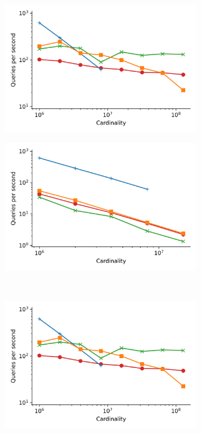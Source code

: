 \begin{figure}
\begin{subfigure}[b]{0.47\textwidth}
        \includegraphics[width=0.95\textwidth]{plots/sift_PermutedBall_10_throughput.png}
        \label{fig:results:sift-scaling}
    \end{subfigure}%
    \begin{subfigure}[b]{0.47\textwidth}
        \includegraphics[width=0.95\textwidth]{plots/random_PermutedBall_10_throughput.png}
        \label{fig:results:random-scaling}
    \end{subfigure}%
    \\
    \begin{subfigure}[b]{0.47\textwidth}
        \includegraphics[width=0.95\textwidth]{plots/sift_PermutedBall_10_throughput.png}

\end{subfigure}
\end{figure}
